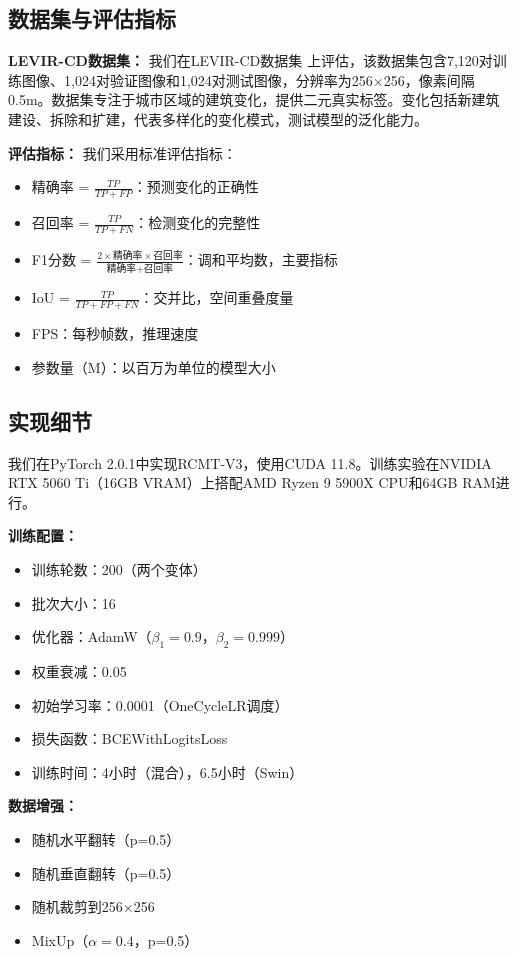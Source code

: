 \documentclass[journal]{IEEEtran}
\begin{document}
\subsection{数据集与评估指标}

\textbf{LEVIR-CD数据集：} 我们在LEVIR-CD数据集 \cite{changeforemer}上评估，该数据集包含7,120对训练图像、1,024对验证图像和1,024对测试图像，分辨率为256$\times$256，像素间隔0.5m。数据集专注于城市区域的建筑变化，提供二元真实标签。变化包括新建筑建设、拆除和扩建，代表多样化的变化模式，测试模型的泛化能力。

\textbf{评估指标：} 我们采用标准评估指标：
\begin{itemize}
\item 精确率 = $\frac{TP}{TP + FP}$：预测变化的正确性
\item 召回率 = $\frac{TP}{TP + FN}$：检测变化的完整性
\item F1分数 = $\frac{2 \times \text{精确率} \times \text{召回率}}{\text{精确率} + \text{召回率}}$：调和平均数，主要指标
\item IoU = $\frac{TP}{TP + FP + FN}$：交并比，空间重叠度量
\item FPS：每秒帧数，推理速度
\item 参数量（M）：以百万为单位的模型大小
\end{itemize}

\subsection{实现细节}

我们在PyTorch 2.0.1中实现RCMT-V3，使用CUDA 11.8。训练实验在NVIDIA RTX 5060 Ti（16GB VRAM）上搭配AMD Ryzen 9 5900X CPU和64GB RAM进行。

\textbf{训练配置：}
\begin{itemize}
\item 训练轮数：200（两个变体）
\item 批次大小：16
\item 优化器：AdamW（$\beta_1=0.9$，$\beta_2=0.999$）
\item 权重衰减：0.05
\item 初始学习率：0.0001（OneCycleLR调度）
\item 损失函数：BCEWithLogitsLoss
\item 训练时间：4小时（混合），6.5小时（Swin）
\end{itemize}

\textbf{数据增强：}
\begin{itemize}
\item 随机水平翻转（p=0.5）
\item 随机垂直翻转（p=0.5）
\item 随机裁剪到256$\times$256
\item MixUp（$\alpha=0.4$，p=0.5）
\end{itemize}
\end{document}
